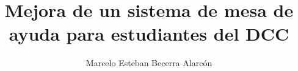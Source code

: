 \documentclass{umemoria}
\author{Marcelo Esteban Becerra Alarcón}
\title{Mejora de un sistema de mesa de ayuda para estudiantes del DCC}
\begin{document}
\frontmatter
\maketitle





\tableofcontents
\listoftables %
\listoffigures %

\mainmatter











\printglossaries

\nocite{*}
% 

% 
\printbibliography


\end{document}
